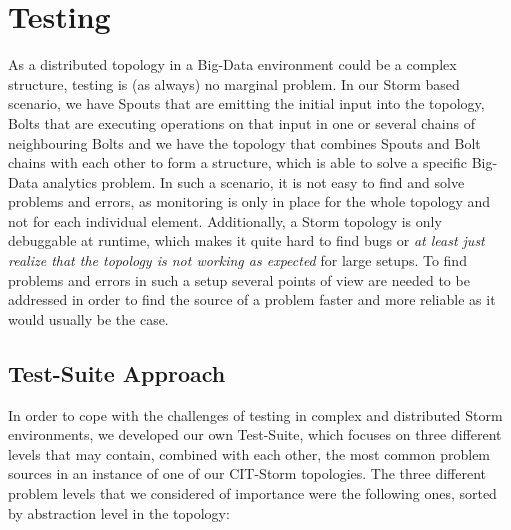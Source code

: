 \section{Testing}
\label{sect:testing}

	As a distributed topology in a Big-Data environment could be a complex structure, testing is (as always) no marginal problem. In our Storm based scenario, we have Spouts that are emitting the initial input into the topology, Bolts that are executing operations on that input in one or several chains of neighbouring Bolts and we have the topology that combines Spouts and Bolt chains with each other to form a structure, which is able to solve a specific Big-Data analytics problem. 
	In such a scenario, it is not easy to find and solve problems and errors, as monitoring is only in place for the whole topology and not for each individual element. Additionally, a Storm topology is only debuggable at runtime, which makes it quite hard to find bugs or \textit{at least just realize that the topology is not working as expected} for large setups. 
	To find problems and errors in such a setup several points of view are needed to be addressed in order to find the source of a problem faster and more reliable as it would usually be the case.
	
\subsection{Test-Suite Approach}
\label{sect:TestSuiteApproach}
	In order to cope with the challenges of testing in complex and distributed Storm environments, we developed our own Test-Suite, which focuses on three different levels that may contain, combined with each other, the most common problem sources in an instance of one of our CIT-Storm topologies. The three different problem levels that we considered of importance were the following ones, sorted by abstraction level in the topology:
	

